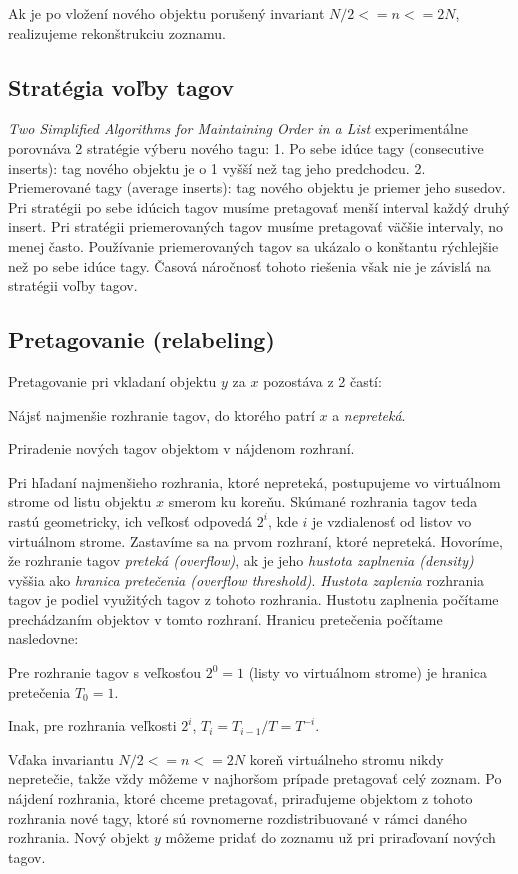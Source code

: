 \documentclass[
  digital,     %
  oneside,     %
  nosansbold,  %
  nocolorbold, %
  lof,         %
  lot,         %
]{fithesis4}
\begin{document}
Ak je po vložení nového objektu porušený invariant $N/2 <= n <= 2N$, realizujeme rekonštrukciu zoznamu.

\subsection{Stratégia voľby tagov}

\textit{Two Simplified Algorithms for Maintaining Order in a List} \cite{paper1_ordered_list} experimentálne porovnáva 2 stratégie výberu nového tagu:
1. Po sebe idúce tagy (consecutive inserts): tag nového objektu je o 1 vyšší než tag jeho predchodcu.
2. Priemerované tagy (average inserts): tag nového objektu je priemer jeho susedov.
Pri stratégii po sebe idúcich tagov musíme pretagovať menší interval každý druhý insert. Pri stratégii priemerovaných tagov musíme pretagovať väčšie intervaly, no menej často.
Používanie priemerovaných tagov sa ukázalo o konštantu rýchlejšie než po sebe idúce tagy. Časová náročnosť tohoto riešenia však nie je závislá na stratégii voľby tagov. 

\subsection{Pretagovanie (relabeling)}
Pretagovanie pri vkladaní objektu $y$ za $x$ pozostáva z 2 častí:
\begin{compactenum}
    \item Nájsť najmenšie rozhranie tagov, do ktorého patrí $x$ a \textit{nepreteká}.
    \item Priradenie nových tagov objektom v nájdenom rozhraní.
\end{compactenum}
Pri hľadaní najmenšieho rozhrania, ktoré nepreteká, postupujeme vo virtuálnom strome od listu objektu $x$ smerom ku koreňu. Skúmané rozhrania tagov teda rastú geometricky, ich veľkosť odpovedá $2^i$, kde $i$ je vzdialenosť od listov vo virtuálnom strome. Zastavíme sa na prvom rozhraní, ktoré nepreteká.
Hovoríme, že rozhranie tagov \textit{preteká (overflow)}, ak je jeho \textit{hustota zaplnenia (density)} vyššia ako \textit{hranica pretečenia (overflow threshold)}. \textit{Hustota zaplenia} rozhrania tagov je podiel využitých tagov z tohoto rozhrania. Hustotu zaplnenia počítame prechádzaním objektov v tomto rozhraní. Hranicu pretečenia počítame nasledovne:
\begin{compactenum}
    \item Pre rozhranie tagov s veľkosťou $2^0 = 1$ (listy vo virtuálnom strome) je hranica pretečenia $T_0 = 1$.
    \item Inak, pre rozhrania veľkosti $2^i$, $T_i = T_{i-1} / T = T^{-i}$.
\end{compactenum}
Vďaka invariantu $N/2 <= n <= 2N$ koreň virtuálneho stromu nikdy nepretečie, takže vždy môžeme v najhoršom prípade pretagovať celý zoznam.
Po nájdení rozhrania, ktoré chceme pretagovať, priraďujeme objektom z tohoto rozhrania nové tagy, ktoré sú rovnomerne rozdistribuované v rámci daného rozhrania. Nový objekt $y$ môžeme pridať do zoznamu už pri priraďovaní nových tagov.
\end{document}
